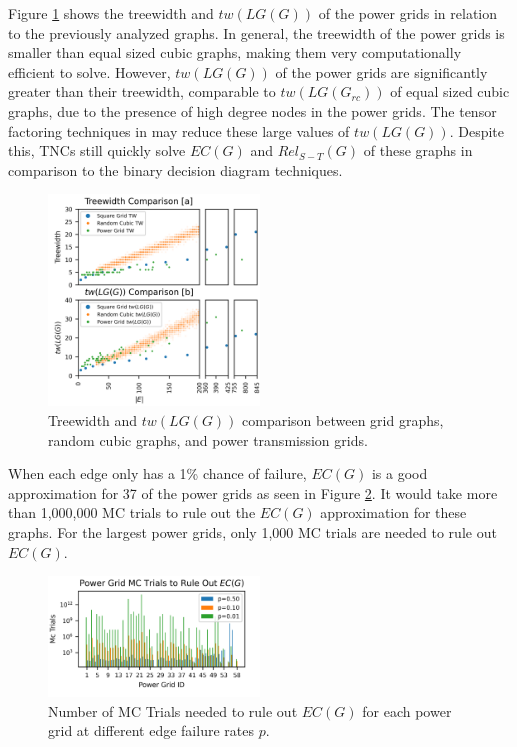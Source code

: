 Figure \ref{fig:Width Comparison} shows the treewidth and \(tw(LG(G))\) of the power grids in relation to the previously analyzed graphs. In general, the treewidth of the power grids is smaller than equal sized cubic graphs, making them very computationally efficient to solve. However, \(tw(LG(G))\) of the power grids are significantly greater than their treewidth, comparable to \(tw(LG(G_{rc}))\) of equal sized cubic graphs, due to the presence of high degree nodes in the power grids. The tensor factoring techniques in \cite{dudek2019efficient} may reduce these large values of \(tw(LG(G))\). Despite this, TNCs still quickly solve \(EC(G)\) and \(Rel_{S-T}(G)\) of these graphs in comparison to the binary decision diagram techniques.

\begin{figure}[t]
\caption{Treewidth and $tw(LG(G))$ comparison between grid graphs, random cubic graphs, and power transmission grids.}
\label{fig:Width Comparison}
\includegraphics[width=0.5\textwidth]{../figures/WidthCompare.png}
\end{figure}

When each edge only has a 1\% chance of failure, \(EC(G)\) is a good approximation for 37 of the power grids as seen in Figure \ref{fig:Power Grid MC}. It would take more than 1,000,000 MC trials to rule out the \(EC(G)\) approximation for these graphs. For the largest power grids, only 1,000 MC trials are needed to rule out \(EC(G)\).

\begin{figure}[t]
\caption{Number of MC Trials needed to rule out $EC(G)$ for each power grid at different edge failure rates $p$.}
\label{fig:Power Grid MC}
\includegraphics[width=0.5\textwidth]{../figures/PowerGridMC.png}
\end{figure}

